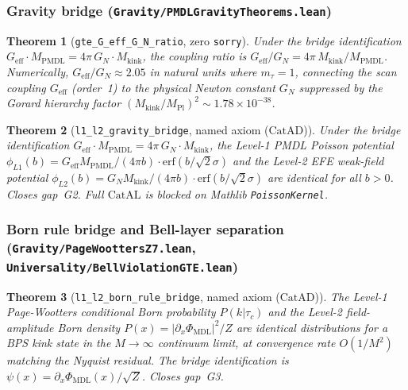 \documentclass[11pt,a4paper]{article}
\newtheorem{theorem}{Theorem}[section]
\theoremstyle{definition}
\newcommand{\CatAL}{\ensuremath{\mathrm{CatAL}}}
\newcommand{\CatAD}{\ensuremath{\mathrm{CatAD}}}
\begin{document}
\subsubsection{Gravity bridge
  (\texttt{Gravity/PMDLGravityTheorems.lean})}\label{subsubsec:gravity-bridge}

\begin{theorem}[\lstinline|gte_G_eff_G_N_ratio|, zero \texttt{sorry}]
Under the bridge identification $G_{\mathrm{eff}}\cdot M_{\mathrm{PMDL}}
= 4\pi\,G_N\cdot M_{\mathrm{kink}}$, the coupling ratio is
$G_{\mathrm{eff}}/G_N = 4\pi\,M_{\mathrm{kink}}/M_{\mathrm{PMDL}}$.
Numerically, $G_{\mathrm{eff}}/G_N\approx 2.05$ in natural units where
$m_\tau=1$, connecting the scan coupling $G_{\mathrm{eff}}$ (order~1) to the
physical Newton constant $G_N$ suppressed by the Gorard hierarchy factor
$(M_{\mathrm{kink}}/M_{\mathrm{Pl}})^2\sim 1.78\times 10^{-38}$.
\end{theorem}

\begin{theorem}[\lstinline|l1_l2_gravity_bridge|, named axiom ($\CatAD$)]
Under the bridge identification $G_{\mathrm{eff}}\cdot M_{\mathrm{PMDL}}
= 4\pi\,G_N\cdot M_{\mathrm{kink}}$, the Level-1 PMDL Poisson potential
$\phi_{L1}(b)=G_{\mathrm{eff}}M_{\mathrm{PMDL}}/(4\pi b)\cdot\mathrm{erf}(b/\sqrt{2}\sigma)$
and the Level-2 EFE weak-field potential
$\phi_{L2}(b)=G_N M_{\mathrm{kink}}/(4\pi b)\cdot\mathrm{erf}(b/\sqrt{2}\sigma)$
are identical for all $b>0$.  Closes gap~G2.  Full $\CatAL$ is blocked on
Mathlib \texttt{PoissonKernel}.
\end{theorem}

\subsubsection{Born rule bridge and Bell-layer separation
  (\texttt{Gravity/PageWoottersZ7.lean},
   \texttt{Universality/BellViolationGTE.lean})}\label{subsubsec:born-bell-bridge}

\begin{theorem}[\lstinline|l1_l2_born_rule_bridge|, named axiom ($\CatAD$)]
The Level-1 Page-Wootters conditional Born probability $P(k|\tau_c)$ and the
Level-2 field-amplitude Born density $P(x)=|\partial_x\Phi_{\mathrm{MDL}}|^2/Z$
are identical distributions for a BPS kink state in the $M\to\infty$ continuum
limit, at convergence rate $O(1/M^2)$ matching the Nyquist residual.
The bridge identification is $\psi(x)=\partial_x\Phi_{\mathrm{MDL}}(x)/\sqrt{Z}$.
Closes gap~G3.
\end{theorem}
\end{document}

